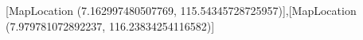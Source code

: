 [MapLocation (7.162997480507769, 115.54345728725957)],[MapLocation (7.979781072892237, 116.23834254116582)]